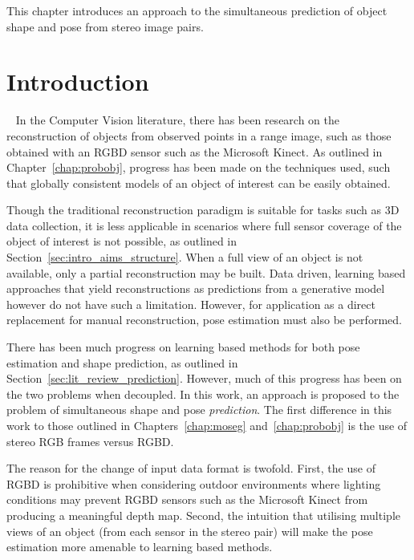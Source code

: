 \label{chap:spp}
\begin{chapterabstract}
This chapter introduces an approach to the simultaneous prediction of object shape 
and pose from stereo image pairs.
\end{chapterabstract}

\section{Introduction}
~\label{sec:spp_introduction}
In the Computer Vision literature, there has been research on the reconstruction of objects
from observed points in a range image, such as those obtained with an RGBD sensor such 
as the Microsoft Kinect. As outlined in Chapter~\ref{chap:probobj}, progress has been made 
on the techniques used, such that globally consistent models of an object of interest can be 
easily obtained.

Though the traditional reconstruction paradigm is suitable for tasks such as 3D data 
collection, it is less applicable in scenarios where full sensor coverage of the object 
of interest is not possible, as outlined in Section~\ref{sec:intro_aims_structure}. When a full 
view of an object is not available, only a partial reconstruction may be built. Data driven, 
learning based approaches that yield reconstructions as predictions from a generative model 
however do not have such a limitation. However, for application as a direct replacement for 
manual reconstruction, pose estimation must also be performed.

There has been much progress on learning based methods for both pose estimation and 
shape prediction, as outlined in Section~\ref{sec:lit_review_prediction}. However, much of 
this progress has been on the two problems when decoupled. In this work, an approach is 
proposed to the problem of simultaneous shape and pose \textit{prediction}. The first 
difference in this work to those outlined in Chapters~\ref{chap:moseg} and~\ref{chap:probobj} 
is the use of stereo RGB frames versus RGBD\@. 

The reason for the change of input data format is twofold. First, the use of RGBD is prohibitive 
when considering outdoor environments where lighting conditions may prevent RGBD sensors such as the 
Microsoft Kinect from producing a meaningful depth map. Second, the intuition that utilising multiple 
views of an object (from each sensor in the stereo pair) will make the pose estimation more amenable to 
learning based methods.

